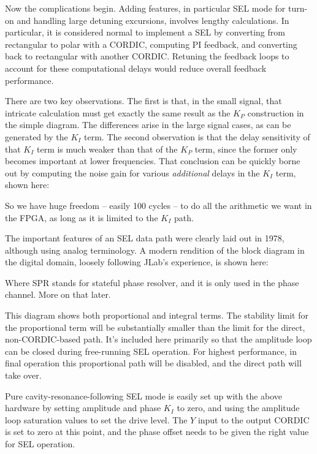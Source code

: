 Now the complications begin.  Adding features, in particular SEL mode for
turn-on and handling large detuning excursions, involves lengthy calculations.
In particular, it is considered normal to implement a SEL by converting
from rectangular to polar with a CORDIC, computing PI feedback, and
converting back to rectangular with another \hbox{CORDIC}.  Retuning the
feedback loops to account for these computational delays would reduce
overall feedback performance.

\hfill\eject
There are two key observations.  The first is that, in the small signal,
that intricate calculation must get exactly the same result as the $K_P$
construction in the simple diagram.  The differences arise in the large
signal cases, as can be generated by the $K_I$ term.  The second observation
is that the delay sensitivity of that $K_I$ term is much weaker than that
of the $K_P$ term, since the former only becomes important at lower frequencies.
That conclusion can be quickly borne out by computing the noise gain for
various {\it additional} delays in the $K_I$ term, shown here:


So we have huge freedom -- easily 100 cycles -- to do all the arithmetic we
want in the FPGA, as long as it is limited to the $K_I$ path.

\hfill\eject

The important features of an SEL data path were clearly laid out in 1978,
although using analog terminology.  A modern rendition of the block diagram
in the digital domain, loosely following JLab's experience, is shown here:


Where SPR stands for stateful phase resolver, and it is only used in the
phase channel.  More on that later.

This diagram shows both proportional and integral terms.  The stability limit
for the proportional term will be substantially smaller than the limit for
the direct, non-CORDIC-based path.  It's included here primarily so that the
amplitude loop can be closed during free-running SEL operation.  For highest
performance, in final operation this proportional path will be disabled, and
the direct path will take over.

Pure cavity-resonance-following SEL mode is easily set up with the
above hardware by setting amplitude and phase $K_I$ to zero, and
using the amplitude loop saturation values to set the drive level.
The $Y$ input to the output CORDIC is set to zero at this point, and the
phase offset needs to be given the right value for SEL operation.

